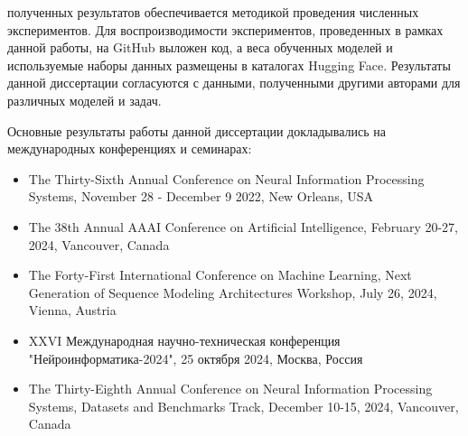 
{\reliability} полученных результатов обеспечивается методикой проведения численных экспериментов. Для воспроизводимости экспериментов, проведенных в рамках данной работы, на GitHub выложен код, а веса обученных моделей и используемые наборы данных размещены в каталогах Hugging Face. Результаты данной диссертации согласуются с данными, полученными другими авторами для различных моделей и задач.


{\probation} Основные результаты работы данной диссертации докладывались на международных конференциях и семинарах:

\begin{itemize}
    \item The Thirty-Sixth Annual Conference on Neural Information Processing Systems, November 28 - December 9 2022, New Orleans, USA



    \item The 38th Annual AAAI Conference on Artificial Intelligence, February 20-27, 2024, Vancouver, Canada

    \item The Forty-First International Conference on Machine Learning, Next Generation of Sequence Modeling Architectures Workshop, July 26, 2024, Vienna, Austria


    \item XXVI Международная научно-техническая конференция "Нейроинформатика-2024", 25 октября 2024, Москва, Россия    



    \item The Thirty-Eighth Annual Conference on Neural Information Processing Systems, Datasets and Benchmarks Track, December 10-15, 2024, Vancouver, Canada

\end{itemize}

